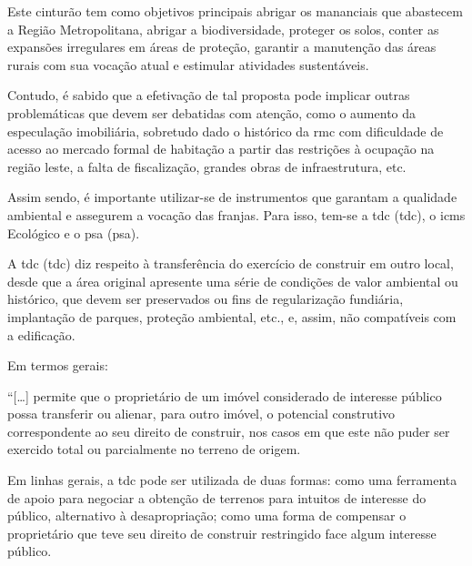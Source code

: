	Este cinturão tem como objetivos principais abrigar os mananciais que abastecem a Região Metropolitana, abrigar a biodiversidade, proteger os solos, conter as expansões irregulares em áreas de proteção, garantir a manutenção das áreas rurais com sua vocação atual e estimular atividades sustentáveis.
	
	Contudo, é sabido que a efetivação de tal proposta pode implicar outras problemáticas que devem ser debatidas com atenção, como o aumento da especulação imobiliária, sobretudo dado o histórico da \gls{rmc} com dificuldade de acesso ao mercado formal de habitação a partir das restrições à ocupação na região leste, a falta de fiscalização, grandes obras de infraestrutura, etc.
	
	Assim sendo, é importante utilizar-se de instrumentos que garantam a qualidade ambiental e assegurem a vocação das franjas. Para isso, tem-se a \glsdesc{tdc} (\gls{tdc}), o \gls{icms} Ecológico e o \glsdesc{psa} (\gls{psa}).
	
	A \glsdesc{tdc} (\gls{tdc}) diz respeito à transferência do exercício de construir em outro local, desde que a área original apresente uma série de condições de valor ambiental ou histórico, que devem ser preservados ou fins de regularização fundiária, implantação de parques, proteção ambiental, etc., e, assim, não compatíveis com a edificação.
	
	Em termos gerais:
	
	\begin{citacao}
		``[\dots] permite que o proprietário de um imóvel considerado de interesse público possa transferir ou alienar, para outro imóvel, o potencial construtivo correspondente ao seu direito de construir, nos casos em que este não puder ser exercido total ou parcialmente no terreno de origem. \cite[p. 1]{peretto2019a}
	\end{citacao}

	Em linhas gerais, a \gls{tdc} pode ser utilizada de duas formas: como uma ferramenta de apoio para negociar a obtenção de terrenos para intuitos de interesse do público, alternativo à desapropriação; como uma forma de compensar o proprietário que teve seu direito de construir restringido face algum interesse público.
	
